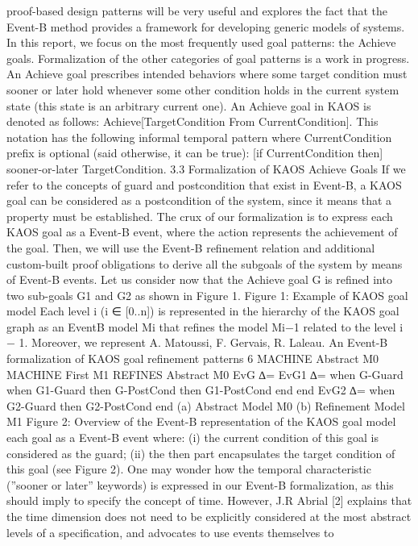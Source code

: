proof-based design patterns will be very useful and explores the fact that the Event-B method
provides a framework for developing generic models of systems. In this report, we focus on the
most frequently used goal patterns: the Achieve goals. Formalization of the other categories
of goal patterns is a work in progress. An Achieve goal prescribes intended behaviors where
some target condition must sooner or later hold whenever some other condition holds in the
current system state (this state is an arbitrary current one). An Achieve goal in KAOS is
denoted as follows: Achieve[TargetCondition From CurrentCondition]. This notation
has the following informal temporal pattern where CurrentCondition prefix is optional
(said otherwise, it can be true):
[if CurrentCondition then] sooner-or-later TargetCondition.
3.3 Formalization of KAOS Achieve Goals
If we refer to the concepts of guard and postcondition that exist in Event-B, a KAOS goal
can be considered as a postcondition of the system, since it means that a property must be
established. The crux of our formalization is to express each KAOS goal as a Event-B event,
where the action represents the achievement of the goal. Then, we will use the Event-B
refinement relation and additional custom-built proof obligations to derive all the subgoals
of the system by means of Event-B events. Let us consider now that the Achieve goal G is
refined into two sub-goals G1 and G2 as shown in Figure 1.
Figure 1: Example of KAOS goal model
Each level i (i ∈ [0..n]) is represented in the hierarchy of the KAOS goal graph as an EventB model Mi that refines the model Mi−1 related to the level i − 1. Moreover, we represent
A. Matoussi, F. Gervais, R. Laleau. An Event-B formalization of KAOS goal refinement patterns 6
MACHINE Abstract M0 MACHINE First M1
REFINES Abstract M0
EvG ∆= EvG1 ∆=
when G-Guard when G1-Guard
then G-PostCond then G1-PostCond
end end
EvG2 ∆=
when G2-Guard
then G2-PostCond
end
(a) Abstract Model M0 (b) Refinement Model M1
Figure 2: Overview of the Event-B representation of the KAOS goal model
each goal as a Event-B event where: (i) the current condition of this goal is considered as the
guard; (ii) the then part encapsulates the target condition of this goal (see Figure 2).
One may wonder how the temporal characteristic (”sooner or later” keywords) is expressed
in our Event-B formalization, as this should imply to specify the concept of time. However,
J.R Abrial [2] explains that the time dimension does not need to be explicitly considered
at the most abstract levels of a specification, and advocates to use events themselves to
